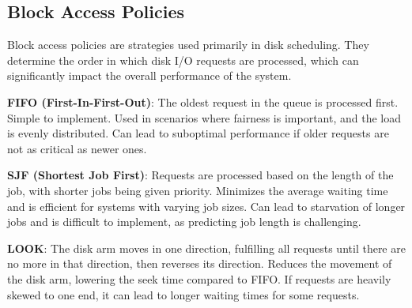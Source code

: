 \vspace{-0.3cm}
\subsection*{Block Access Policies}
\vspace{-0.1cm}

\noindent
Block access policies are strategies used primarily in disk scheduling. They determine the order in which disk I/O requests are processed, which can significantly impact the overall performance of the system.

\noindent
\textbf{FIFO (First-In-First-Out)}: The oldest request in the queue is processed first.
Simple to implement. Used in scenarios where fairness is important, and the load is evenly distributed.
Can lead to suboptimal performance if older requests are not as critical as newer ones.

\noindent
\textbf{SJF (Shortest Job First)}: Requests are processed based on the length of the job, with shorter jobs being given priority.
Minimizes the average waiting time and is efficient for systems with varying job sizes.
Can lead to starvation of longer jobs and is difficult to implement, as predicting job length is challenging.

\noindent
\textbf{LOOK}: The disk arm moves in one direction, fulfilling all requests until there are no more in that direction, then reverses its direction.
Reduces the movement of the disk arm, lowering the seek time compared to FIFO.
If requests are heavily skewed to one end, it can lead to longer waiting times for some requests.

